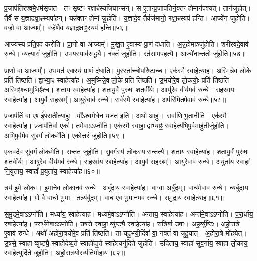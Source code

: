 प्र॒जा\-प॑तिरश्वमे॒धम॑\-सृजत।
तꣳ सृ॒ष्टꣳ रक्षाꣴ॑स्यजिघाꣳसन्।
स ए॒तान्प्र॒जा\-प॑तिर्न॒क्तꣳ हो॒मान॑पश्यत्।
तान॑जुहोत्।
तैर्वै स य॒ज्ञाद्रक्षा॒ꣴ॒स्यपा॑हन्।
यन्न॑क्तꣳ हो॒मां जु॒होति॑।
य॒ज्ञादे॒व तैर्यज॑मानो॒ रक्षा॒ꣴ॒स्यप॑ हन्ति।
आज्ये॑न जुहोति।
वज्रो॒ वा आज्यम्᳚।
वज्रे॑णै॒व य॒ज्ञाद्रक्षा॒ꣴ॒स्यप॑ हन्ति॥५६॥\ip

आज्य॑स्य प्रति॒पदं॑ करोति।
प्रा॒णो वा आज्यम्᳚।
मु॒ख॒त ए॒वास्य॑ प्रा॒णं द॑धाति।
अ॒न्न॒हो॒माञ्जु॑होति।
शरी॑रवदे॒वाव॑ रुन्धे।
व्य॒त्यासं॑ जुहोति।
उ॒भय॒स्या\-व॑\-रुद्ध्यै।
नक्तं॑ जुहोति।
रक्ष॑सा॒मप॑हत्यै।
आज्ये॑नान्त॒तो जु॑होति॥५७॥\ip

प्रा॒णो वा आज्यम्᳚।
उ॒भ॒यत॑ ए॒वास्य॑ प्रा॒णं द॑धाति।
पु॒रस्ता᳚च्चो॒परि॑ष्टाच्च।
एक॑स्मै॒ स्वाहेत्या॑ह।
अ॒स्मिन्ने॒व लो॒के प्रति॑ तिष्ठति।
द्वाभ्या॒ꣴ॒ स्वाहेत्या॑ह।
अ॒मुष्मि॑न्ने॒व लो॒के प्रति॑ तिष्ठति।
उ॒भयो॑रे॒व लो॒कयोः॒ प्रति॑ तिष्ठति।
अ॒स्मिꣴश्चा॒मुष्मिꣴ॑श्च।
श॒ताय॒ स्वाहेत्या॑ह।
श॒तायु॒र्वै पुरु॑षः श॒तवी᳚र्यः।
आयु॑रे॒व वी॒र्य॑मव॑ रुन्धे।
स॒हस्रा॑य॒ स्वाहेत्या॑ह।
आयु॒र्वै स॒हस्रम्᳚।
आयु॑रे॒वाव॑ रुन्धे।
सर्व॑स्मै॒ स्वाहेत्या॑ह।
अप॑रिमितमे॒वाव॑ रुन्धे॥५८॥\ip\anuvakamend[ए॒व य॒ज्ञाद्रक्षा॒ꣴ॒स्यप॑हन्त्यन्त॒तो जु॑होति श॒ताय॒ स्वाहेत्या॑ह स॒प्त च॑]

प्र॒जा\-प॑तिं॒ वा ए॒ष ई᳚फ्स॒तीत्या॑हुः।
यो᳚ऽश्वमे॒धेन॒ यज॑त॒ इति॑।
अथो॑ आहुः।
सर्वा॑णि भू॒तानीति॑।
एक॑स्मै॒ स्वाहेत्या॑ह।
प्र॒जा\-प॑ति॒र्वा एकः॑।
तमे॒वाऽऽप्नो॑ति।
एक॑स्मै॒ स्वाहा॒ द्वाभ्या॒ꣴ॒ स्वाहेत्य॑भिपू॒र्वमाहु॑तीर्जुहोति।
अ॒भि॒पू॒र्वमे॒व सु॑व॒र्गं लो॒कमे॑ति।
ए॒को॒त्त॒रं जु॑होति॥५९॥\ip

ए॒क॒वदे॒व सु॑व॒र्गं लो॒कमे॑ति।
सन्त॑तं जुहोति।
सु॒व॒र्गस्य॑ लो॒कस्य॒ सन्त॑त्यै।
श॒ताय॒ स्वाहेत्या॑ह।
श॒तायु॒र्वै पुरु॑षः श॒तवी᳚र्यः।
आयु॑रे॒व वी॒र्य॑मव॑ रुन्धे।
स॒हस्रा॑य॒ स्वाहेत्या॑ह।
आयु॒र्वै स॒हस्रम्᳚।
आयु॑रे॒वाव॑ रुन्धे।
अ॒युता॑य॒ स्वाहा॑ नि॒युता॑य॒ स्वाहा᳚ प्र॒युता॑य॒ स्वाहेत्या॑ह॥६०॥\ip

त्रय॑ इ॒मे लो॒काः।
इ॒माने॒व लो॒कानव॑ रुन्धे।
अर्बु॑दाय॒ स्वाहेत्या॑ह।
वाग्वा अर्बु॑दम्।
वाच॑मे॒वाव॑ रुन्धे।
न्य॑र्बुदाय॒ स्वाहेत्या॑ह।
यो वै वा॒चो भू॒मा।
तन्न्य॑र्बुदम्।
वा॒च ए॒व भू॒मान॒मव॑ रुन्धे।
स॒मु॒द्राय॒ स्वाहेत्या॑ह॥६१॥\ip

स॒मु॒द्रमे॒वाऽऽप्नो॑ति।
मध्या॑य॒ स्वाहेत्या॑ह।
मध्य॑मे॒वाऽऽप्नो॑ति।
अन्ता॑य॒ स्वाहेत्या॑ह।
अन्त॑मे॒वाऽऽप्नो॑ति।
प॒रा॒र्धाय॒ स्वाहेत्या॑ह।
प॒रा॒र्धमे॒वाऽऽप्नो॑ति।
उ॒षसे॒ स्वाहा॒ व्यु॑ष्ट्यै॒ स्वाहेत्या॑ह।
रात्रि॒र्वा उ॒षाः।
अह॒र्व्यु॑ष्टिः।
अ॒हो॒रा॒त्रे ए॒वाव॑ रुन्धे।
अथो॑ अहोरा॒त्रयो॑रे॒व प्रति॑ तिष्ठति।
ता यदु॒भयी॒र्दिवा॑ वा॒ नक्तं॑ वा जुहु॒यात्।
अ॒हो॒रा॒त्रे मो॑हयेत्।
उ॒षसे॒ स्वाहा॒ व्यु॑ष्ट्यै॒ स्वाहो॑देष्य॒ते स्वाहो᳚द्य॒ते स्वाहेत्यनु॑दिते जुहोति।
उदि॑ताय॒ स्वाहा॑ सुव॒र्गाय॒ स्वाहा॑ लो॒काय॒ स्वाहेत्युदि॑ते जुहोति।
अ॒हो॒रा॒त्रयो॒रव्य॑तिमोहाय॥६२॥\ip\anuvakamend[ए॒को॒त्त॒रं जु॑होति प्र॒युता॑य॒ स्वाहेत्या॑ह समु॒द्राय॒ स्वाहेत्या॒हाह॒र्व्यु॑ष्टिः स॒प्त च॑]

